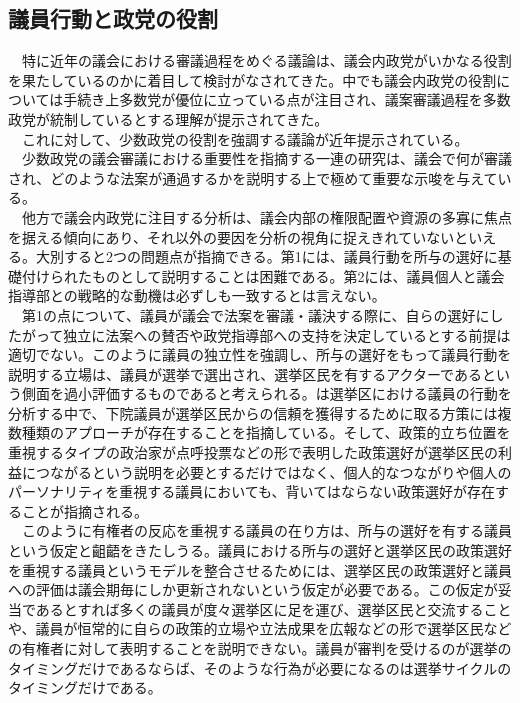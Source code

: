 \documentclass{article}
\begin{document}
\subsection{議員行動と政党の役割}
　特に近年の議会における審議過程をめぐる議論は、議会内政党がいかなる役割を果たしているのかに着目して検討がなされてきた。中でも議会内政党の役割については手続き上多数党が優位に立っている点が注目され、議案審議過程を多数政党が統制しているとする理解が提示されてきた。\citep*{Cox2005-pn,Cox2007-xq}\\
　これに対して、少数政党の役割を強調する議論が近年提示されている。\citep*{Hughes2018-dj,Hughes2021-cp,Ballard2021-su}\\
　少数政党の議会審議における重要性を指摘する一連の研究は、議会で何が審議され、どのような法案が通過するかを説明する上で極めて重要な示唆を与えている。\\
　他方で議会内政党に注目する分析は、議会内部の権限配置や資源の多寡に焦点を据える傾向にあり、それ以外の要因を分析の視角に捉えきれていないといえる。大別すると2つの問題点が指摘できる。第1には、議員行動を所与の選好に基礎付けられたものとして説明することは困難である。第2には、議員個人と議会指導部との戦略的な動機は必ずしも一致するとは言えない。\\
　第1の点について、議員が議会で法案を審議・議決する際に、自らの選好にしたがって独立に法案への賛否や政党指導部への支持を決定しているとする前提は適切でない。このように議員の独立性を強調し、所与の選好をもって議員行動を説明する立場は、議員が選挙で選出され、選挙区民を有するアクターであるという側面を過小評価するものであると考えられる。\citet*{Fenno1977-se,Fenno2000-up}は選挙区における議員の行動を分析する中で、下院議員が選挙区民からの信頼を獲得するために取る方策には複数種類のアプローチが存在することを指摘している。そして、政策的立ち位置を重視するタイプの政治家が点呼投票などの形で表明した政策選好が選挙区民の利益につながるという説明を必要とするだけではなく、個人的なつながりや個人のパーソナリティを重視する議員においても、背いてはならない政策選好が存在することが指摘される。\citep*{Fenno2000-up}\\
　このように有権者の反応を重視する議員の在り方は、所与の選好を有する議員という仮定と齟齬をきたしうる。議員における所与の選好と選挙区民の政策選好を重視する議員というモデルを整合させるためには、選挙区民の政策選好と議員への評価は議会期毎にしか更新されないという仮定が必要である。この仮定が妥当であるとすれば多くの議員が度々選挙区に足を運び、選挙区民と交流することや、議員が恒常的に自らの政策的立場や立法成果を広報などの形で選挙区民などの有権者に対して表明することを説明できない。議員が審判を受けるのが選挙のタイミングだけであるならば、そのような行為が必要になるのは選挙サイクルのタイミングだけである。\\
\end{document}

